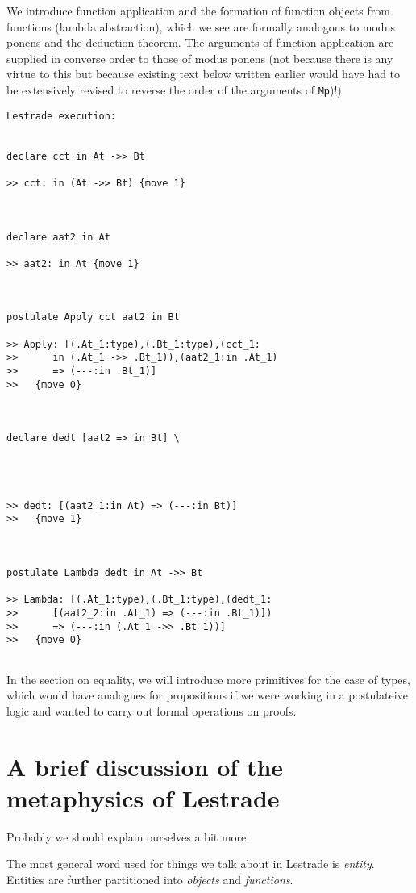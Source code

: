\documentclass[12pt]{article}
\begin{document}
We introduce function application and the formation of function objects from functions (lambda abstraction), which we see are formally analogous to modus ponens and the deduction theorem.  The arguments of function application are supplied in converse order to those of modus ponens (not because there is any virtue to this but because existing text below written earlier would have had to be extensively revised to reverse the order of the arguments of {\tt Mp})!)

\begin{verbatim}Lestrade execution:


declare cct in At ->> Bt

>> cct: in (At ->> Bt) {move 1}



declare aat2 in At

>> aat2: in At {move 1}



postulate Apply cct aat2 in Bt

>> Apply: [(.At_1:type),(.Bt_1:type),(cct_1:
>>      in (.At_1 ->> .Bt_1)),(aat2_1:in .At_1)
>>      => (---:in .Bt_1)]
>>   {move 0}



declare dedt [aat2 => in Bt] \
   



>> dedt: [(aat2_1:in At) => (---:in Bt)]
>>   {move 1}



postulate Lambda dedt in At ->> Bt

>> Lambda: [(.At_1:type),(.Bt_1:type),(dedt_1:
>>      [(aat2_2:in .At_1) => (---:in .Bt_1)])
>>      => (---:in (.At_1 ->> .Bt_1))]
>>   {move 0}


\end{verbatim}

In the section on equality, we will introduce more primitives for the case of types, which would have analogues for propositions if we were working in a postulateive logic and wanted to carry out formal operations on proofs.

\newpage

\section{A brief discussion of the metaphysics of Lestrade}

Probably we should explain ourselves a bit more.

The most general word used for things we talk about in Lestrade is {\em entity\/}.  Entities are further partitioned into {\em objects} and {\em functions}.
\end{document}
